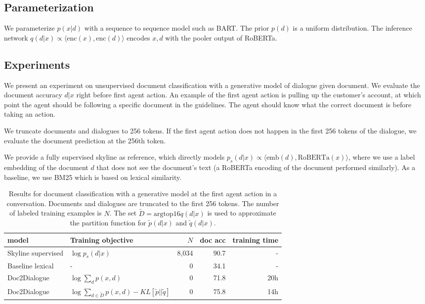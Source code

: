 \documentclass[11pt]{article}
\begin{document}
\subsection{Parameterization}
We parameterize $p(x|d)$ with a sequence to sequence model such as BART.
The prior $p(d)$ is a uniform distribution.
The inference network $q(d|x) \propto \langle\text{enc}(x),\text{enc}(d)\rangle$
encodes $x,d$ with the pooler output of RoBERTa.

\subsection{Experiments}
We present an experiment on
unsupervised document classification with a generative model of dialogue given document.
We evaluate the document accuracy $d|x$ right before first agent action.
An example of the first agent action is pulling up the customer's account,
at which point the agent should be following a specific document in the guidelines.
The agent should know what the correct document is before taking an action.

We truncate documents and dialogues to 256 tokens.
If the first agent action does not happen in the first 256 tokens of the dialogue,
we evaluate the document prediction at the 256th token.

We provide a fully supervised skyline as reference, which directly models
$p_s(d|x) \propto \langle \text{emb}(d), \text{RoBERTa}(x)\rangle$,
where we use a label embedding of the document $d$ that does not see
the document's text (a RoBERTa encoding of the document performed similarly).
As a baseline, we use BM25 which is based on lexical similarity.

\begin{table*}
\centering
\begin{tabular}{llrrr}
\toprule
model                             & Training objective     & $N$   & doc acc & training time\\
\midrule
Skyline supervised                & $\log p_s(d|x)$        & 8,034 &    90.7 & -\\
Baseline lexical                  & -                      & 0     &    34.1 & -\\
Doc2Dialogue                      & $\log \sum_dp(x,d)$    & 0     &    71.8 & 20h\\
Doc2Dialogue                      & $\log \sum_{d\in\tilde{D}} p(x,d) - KL[\tilde{p}||\tilde{q}]$ & 0     &    75.8 & 14h\\
\bottomrule
\end{tabular}
\caption{
\label{tbl:unsup-doc}
Results for document classification with a generative model at the first
agent action in a conversation. Documents and dialogues are truncated to the first 256
tokens.
The number of labeled training examples is $N$.
The set $\tilde{D}=\text{argtop16}q(d|x)$ is used to approximate the
partition function for $\tilde{p}(d|x)$ and $\tilde{q}(d|x)$.
}
\end{table*}
\end{document}
